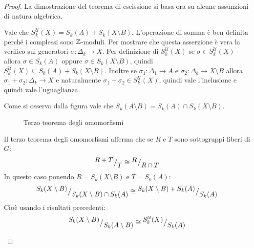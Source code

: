 \begin{proof}
  La dimostrazione del teorema di escissione si basa ora su alcune assunzioni
  di natura algebrica.

  \begin{osservation}
    Vale che $ S_k^\mathcal{U}(X) = S_k(A) + S_k(X \setminus B) $. L'operazione di somma
    è ben definita perché i complessi sono $ \mathbb{Z} $-moduli. Per mostrare che
    questa asserzione è vera la verifico sui generatori
    $ \sigma \colon \Delta_k \to X $. Per definizione di $ S_k^\mathcal{U}(X) $ se
    $ \sigma \in S_k^\mathcal{U}(X) $ allora $ \sigma \in S_k(A) $ oppure
    $ \sigma \in S_k(X\setminus B) $, quindi
    $ S_k^\mathcal{U}(X) \subseteq S_k(A) + S_k(X \setminus B) $. Inoltre se
    $ \sigma_1 \colon \Delta_1 \to A $ e
    $ \sigma_2 \colon \Delta_k \to X \setminus B $ allora
    $ \sigma_1 + \sigma_2 \colon \Delta_k \to X $ e naturalmente
    $ \sigma_1 + \sigma_2 \in S_k^\mathcal{U}(X) $, quindi vale l'inclusione e quindi vale
    l'uguaglianza.
  \end{osservation}

  \begin{osservation}
    Come si osserva dalla figura vale che $ S_k(A \setminus B) = S_k(A) \cap S_k(X \setminus B) $.
  \end{osservation}

  \begin{figure}[htbp]
    \centering
    \caption{Terzo teorema degli omomorfismi}
    \label{fig:lez14:excision_proof}
  \end{figure}

  \begin{osservation}
    Il terzo teorema degli omomorfismi afferma che se $ R $ e $ T $ sono sottogruppi
    liberi di $ G $:
    \[
      {^{\textstyle R + T}\big/_{\textstyle T}} \cong {^{\textstyle R}\big/_{\textstyle R \cap T}}
    \]
    In questo caso ponendo $ R = S_k(X \setminus B) $ e $ T = S_k(A) $:
    \[
      {^{\textstyle S_k(X \setminus B)}\big/_{\textstyle S_k(X \setminus B) \cap S_k(A)}} \cong {^{\textstyle S_k(X \setminus B) + S_k(A)}\big/_{\textstyle S_k(A)}}
    \]
    Cioè usando i risultati precedenti:
    \[
      {^{\textstyle S_k(X \setminus B)}\big/_{\textstyle S_k(A \setminus B)}} \cong {^{\textstyle S_k^\mathcal{U}(X)}\big/_{\textstyle S_k(A)}}
    \]
  \end{osservation}


\end{proof}
